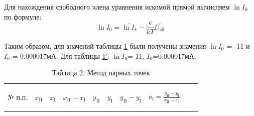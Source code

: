 Для нахождения свободного члена уравнения искомой прямой вычисляем $\ln I_0$ по формуле:
\begin{equation}
\label{eq:5}
    \ln I_0=\overline{\ln I_k}-\frac{e}{kT}\overline{U_{\text{эб}}}
\end{equation}

Таким образом, для значений таблицы \hyperref[tab:1]{1} были получены значения $\ln I_0$ = -11 и $I_0$ = 0.000017мА. Для таблицы \hyperref[tab:1]{1'}: $\ln I_0$=-11, $I_0$=0.000017мА.

\begin{center}
\begin{table}[H]
\centering
\caption*{Таблица 2. Метод парных точек}
\label{tabl:3}
\begin{tabular}{|c|c|c|c|c|c|c|c|c|c|}
\hline
\begin{minipage}{7mm}
    № п.п. 
\end{minipage}&
\begin{minipage}{7mm}
   \begin{center} $x_{\text{II}}$ \end{center} 
\end{minipage} &
\begin{minipage}{7mm}
   \begin{center} $x_{\text{I}}$ \end{center} 
\end{minipage} &
\begin{minipage}{14mm}
   \begin{center} $x_{\text{II}}-x_{\text{I}}$ \end{center} 
\end{minipage}&
\begin{minipage}{7mm}
   \begin{center} $y_{\text{II}}$ \end{center} 
\end{minipage}&
\begin{minipage}{7mm}
   \begin{center} $y_{\text{I}}$ \end{center} 
\end{minipage}&
\begin{minipage}{14mm}
   \begin{center} $y_{\text{II}}-y_{\text{I}}$ \end{center} 
\end{minipage}&
\begin{minipage}{25mm}
   \begin{center} $a_{\text{i}}=\frac{y_{\text{II}}-y_{\text{I}}}{x_{\text{II}}-x_{\text{I}}}$ \end{center} 

\end{minipage}
\end{tabular}
\end{table}
\end{center}
